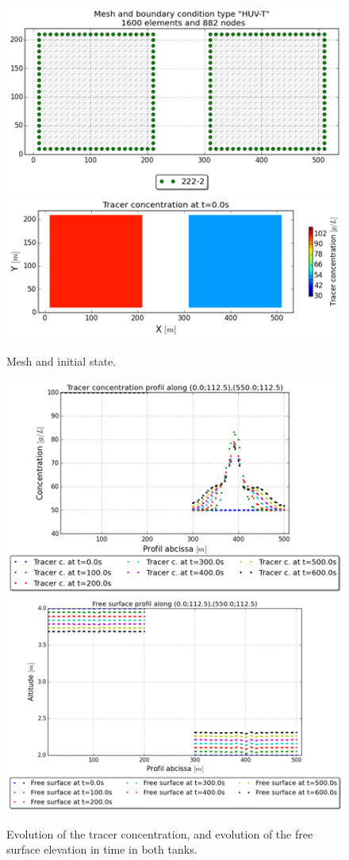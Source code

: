 \begin{figure}
\centering
 \includegraphics{img/image88}
 \includegraphics{img/image89}
 \caption{Mesh and initial state.}\label{fig:siphon:mesh}
\end{figure}


\begin{figure}
\centering
 \includegraphics{img/image90}
 \includegraphics{img/image91}
 \caption{Evolution of the tracer concentration, and evolution of the free surface elevation in time in both tanks.}\label{fig:siphon:evol}
\end{figure}

